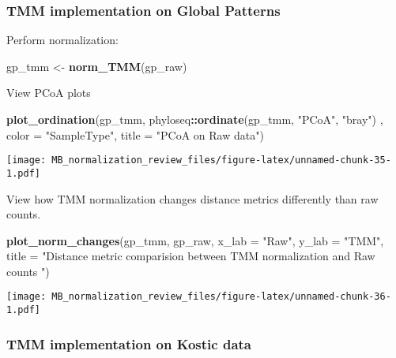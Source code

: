 \documentclass[
]{book}
\newenvironment{Shaded}{\begin{snugshade}}{\end{snugshade}}
\newcommand{\DataTypeTok}[1]{\textcolor[rgb]{0.13,0.29,0.53}{#1}}
\newcommand{\KeywordTok}[1]{\textcolor[rgb]{0.13,0.29,0.53}{\textbf{#1}}}
\newcommand{\NormalTok}[1]{#1}
\newcommand{\OperatorTok}[1]{\textcolor[rgb]{0.81,0.36,0.00}{\textbf{#1}}}
\newcommand{\StringTok}[1]{\textcolor[rgb]{0.31,0.60,0.02}{#1}}
\begin{document}
\hypertarget{tmm-implementation-on-global-patterns}{%
\subsubsection{TMM implementation on Global Patterns}\label{tmm-implementation-on-global-patterns}}

Perform normalization:

\begin{Shaded}
\begin{Highlighting}[]
\NormalTok{gp\_tmm \textless{}{-}}\StringTok{ }\KeywordTok{norm\_TMM}\NormalTok{(gp\_raw)}
\end{Highlighting}
\end{Shaded}

View PCoA plots

\begin{Shaded}
\begin{Highlighting}[]
\KeywordTok{plot\_ordination}\NormalTok{(gp\_tmm, phyloseq}\OperatorTok{::}\KeywordTok{ordinate}\NormalTok{(gp\_tmm, }\StringTok{"PCoA"}\NormalTok{, }\StringTok{"bray"}\NormalTok{) , }\DataTypeTok{color =} \StringTok{"SampleType"}\NormalTok{, }\DataTypeTok{title =} \StringTok{"PCoA on Raw data"}\NormalTok{)}
\end{Highlighting}
\end{Shaded}

\texttt{[image: MB\_normalization\_review\_files/figure-latex/unnamed-chunk-35-1.pdf]}

View how TMM normalization changes distance metrics differently than raw counts.

\begin{Shaded}
\begin{Highlighting}[]
\KeywordTok{plot\_norm\_changes}\NormalTok{(gp\_tmm, gp\_raw,}
                  \DataTypeTok{x\_lab =} \StringTok{"Raw"}\NormalTok{, }\DataTypeTok{y\_lab =} \StringTok{"TMM"}\NormalTok{,}
                  \DataTypeTok{title =} \StringTok{"Distance metric comparision between TMM normalization and Raw counts "}\NormalTok{)}
\end{Highlighting}
\end{Shaded}

\texttt{[image: MB\_normalization\_review\_files/figure-latex/unnamed-chunk-36-1.pdf]}

\hypertarget{tmm-implementation-on-kostic-data}{%
\subsubsection{TMM implementation on Kostic data}\label{tmm-implementation-on-kostic-data}}
\end{document}
